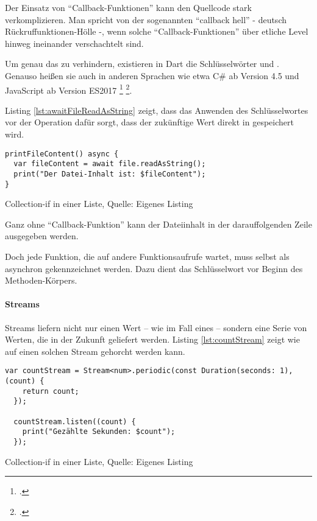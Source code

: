 Der Einsatz von \enquote{Callback-Funktionen} kann den Quellcode stark verkomplizieren.
 Man spricht von der sogenannten \enquote{callback hell} - deutsch Rückruffunktionen-Hölle -, wenn solche \enquote{Callback-Funktionen} über etliche Level hinweg ineinander verschachtelt sind.

Um genau das zu verhindern, existieren in Dart die Schlüsselwörter  und .
Genauso heißen sie auch in anderen Sprachen wie etwa C\# ab Version 4.5 und JavaScript ab Version ES2017
\footcite[Vgl.][]{asyncfunctionJavaScriptMDN}
\footcite[Vgl.][]{Asynchronousprogrammingwithasyncandawait}.


 


Listing \ref{lst:awaitFileReadAsString}
zeigt, dass das Anwenden des Schlüsselwortes  vor der Operation  dafür sorgt, dass der zukünftige Wert direkt in  gespeichert wird.

\ifincludeall
  \begin{listing}[ht]
    \begin{verbatim}
printFileContent() async {
  var fileContent = await file.readAsString();
  print("Der Datei-Inhalt ist: $fileContent");
}
\end{verbatim}
    \caption[Collection-if in einer Liste]{Collection-if in einer Liste, Quelle: Eigenes Listing}
    \label{lst:awaitFileReadAsString}
  \end{listing}
\fi

Ganz ohne \enquote{Callback-Funktion} kann der Dateiinhalt in der darauffolgenden Zeile ausgegeben werden.





Doch jede Funktion, die auf andere Funktionsaufrufe wartet, muss selbst als asynchron gekennzeichnet werden.
Dazu dient das  Schlüsselwort vor Beginn des Methoden-Körpers.

\paragraph{Streams}

Streams liefern nicht nur einen Wert – wie im Fall eines  – sondern eine Serie von Werten, die in der Zukunft geliefert werden.
Listing \ref{lst:countStream} zeigt wie auf einen solchen Stream gehorcht werden kann.
\ifincludeall
  \begin{listing}[ht]
    \begin{verbatim}
var countStream = Stream<num>.periodic(const Duration(seconds: 1), (count) {
    return count;
  });

  countStream.listen((count) {
    print("Gezählte Sekunden: $count");
  });
\end{verbatim}
    \caption[Collection-if in einer Liste]{Collection-if in einer Liste, Quelle: Eigenes Listing}
    \label{lst:countStream}
  \end{listing}
\fi

